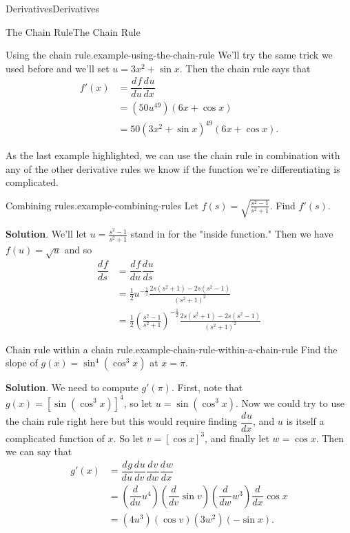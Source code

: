 \documentclass[10pt,]{book}
\numberwithin{equation}{section}
\newcommand{\dv}[3][]{\dfrac{d^{#1} #2}{d #3^{#1}}}
\begin{document}
\begin{chapterptx}{Derivatives}{}{Derivatives}{}{}
\begin{sectionptx}{The Chain Rule}{}{The Chain Rule}{}{}
\begin{example}{Using the chain rule.}{example-using-the-chain-rule}
We'll try the same trick we used before and we'll set \(u = 3x^{2} + \sin x\). Then the chain rule says that%
\begin{align*}
f'(x) & =\dv{f}{u}\dv{u}{x} \\
& = (50u^{49})(6x+\cos x) \\
& = 50(3x^{2} + \sin x)^{49}(6x + \cos x). 
\end{align*}
%
\end{example}
\hypertarget{p-153}{}%
As the last example highlighted, we can use the chain rule in combination with any of the other derivative rules we know if the function we're differentiating is complicated.%
\begin{example}{Combining rules.}{example-combining-rules}%
\hypertarget{p-154}{}%
Let \(f(s) = \sqrt{\frac{s^{2} - 1}{s^{2} + 1}}\). Find \(f'(s)\).%
\par\smallskip%
\noindent\textbf{Solution}.\hypertarget{solution-31}{}\quad%
\hypertarget{p-155}{}%
We'll let \(u = \frac{s^{2}-1}{s^{2}+1}\) stand in for the "inside function." Then we have \(f(u) = \sqrt{u}\) and so%
\begin{align*}
\dv{f}{s} & = \dv{f}{u}\dv{u}{s} \\
& = \frac{1}{2}u^{-\frac{1}{2}}\frac{2s(s^{2}+1) - 2s(s^{2}-1)}{(s^{2}+1)^{2}} \\
& = \frac{1}{2}\left(\frac{s^{2}-1}{s^{2}+1}\right)^{-\frac{1}{2}}\frac{2s(s^{2}+1) - 2s(s^{2}-1)}{(s^{2}+1)^{2}} 
\end{align*}
%
\end{example}
\begin{example}{Chain rule within a chain rule.}{example-chain-rule-within-a-chain-rule}%
\hypertarget{p-156}{}%
Find the slope of \(g(x) = \sin^{4}(\cos^{3}x)\) at \(x=\pi\).%
\par\smallskip%
\noindent\textbf{Solution}.\hypertarget{solution-32}{}\quad%
\hypertarget{p-157}{}%
We need to compute \(g'(\pi)\). First, note that \(g(x) = [\sin(\cos^{3}x)]^{4}\), so let \(u = \sin(\cos^{3}x)\). Now we could try to use the chain rule right here but this would require finding \(\dv{u}{x}\), and \(u\) is itself a complicated function of \(x\). So let \(v = [\cos x]^{3}\), and finally let \(w = \cos x\). Then we can say that%
\begin{align*}
g'(x) & = \dv{g}{u}\dv{u}{v}\dv{v}{w}\dv{w}{x} \\
& = \left(\dv{}{u}u^{4}\right)\left(\dv{}{v}\sin v\right)\left(\dv{}{w}w^{3}\right)\dv{}{x}\cos x \\
& = (4u^{3})(\cos v)(3w^{2})(-\sin x). 

\end{align*}
\end{example}
\end{sectionptx}
\end{chapterptx}
\end{document}
